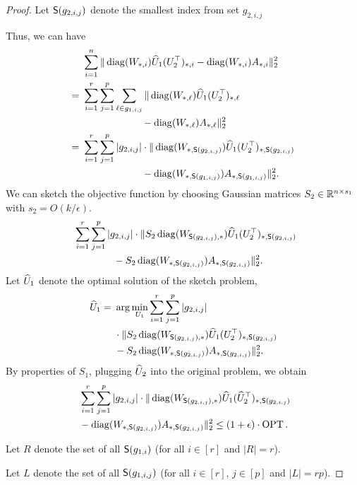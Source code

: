 \begin{proof}
Let $\S(g_{2,i,j})$ denote the smallest index from set $g_{2,i,j}$

Thus, we can have 
\begin{align*}
    & ~ \sum_{i=1}^n \| \diag( W_{*,i} ) \wh{U}_1   (U_2^\top )_{*,i}  -  \diag( W_{*,i} ) A_{*,i} \|_2^2 \\
    = & ~ \sum_{i=1}^r \sum_{j =1}^p \sum_{\ell \in g_{1,i,j}} \|  \diag( W_{*,\ell} ) \wh{U}_1 (U_2^\top )_{*,\ell} \\
    & ~ \quad\quad\quad\quad\quad\quad - \diag( W_{*,\ell} ) A_{*,\ell}  \|_2^2 \\
    = & ~\sum_{i=1}^r \sum_{j =1}^p |g_{2,i,j}| \cdot \|  \diag( W_{ *, \S(g_{2,i,j}) } ) \wh{U}_1 (U_2^\top )_{*, \S(g_{2,i,j})} \\
    & ~ \quad\quad\quad\quad\quad\quad -  \diag( W_{*, \S(g_{1,i,j})} ) A_{*,\S(g_{1,i,j})} \|_2^2 .
\end{align*}
We can sketch the objective function by choosing Gaussian matrices $S_2 \in \R^{n \times s_1}$ with $s_2 = O(k/\epsilon)$.
\begin{align*}
& ~ \sum_{i=1}^r \sum_{j =1}^p |g_{2,i,j}| \cdot \| S_2  \diag( W_{ \S(g_{2,i,j}),*} ) \wh{U}_1  (U_2^\top )_{*, \S(g_{2,i,j}) } \\
& ~ \quad\quad\quad\quad - S_2 \diag( W_{*, \S(g_{2,i,j})} )  A_{*, \S(g_{2,i,j}) }  \|_2^2.
\end{align*}
Let $\wh{U}_1$ denote the optimal solution of the sketch problem,
\begin{align*}
    \wh{U}_1 = & ~ \arg\min_{U_1} \sum_{i=1}^r \sum_{j =1}^p |g_{2,i,j}| \\
    & ~  \cdot \| S_2  \diag( W_{ \S(g_{2,i,j}),*} ) \wh{U}_1  (U_2^\top )_{*, \S(g_{2,i,j}) } \\
    & ~ - S_2 \diag( W_{*, \S(g_{2,i,j})} )  A_{*, \S(g_{2,i,j}) }  \|_2^2.
\end{align*}
By properties of $S_1$, plugging $\wh{U}_2$ into the original problem, we obtain
\begin{align*}
& ~ \sum_{i=1}^r \sum_{j =1}^p |g_{2,i,j}| \cdot \|  \diag( W_{ \S(g_{2,i,j}),*} ) \wh{U}_1  ( \wh{U}_2^\top )_{*, \S(g_{2,i,j}) } \\
& ~ -  \diag( W_{*, \S(g_{2,i,j})} )  A_{*, \S(g_{2,i,j}) }  \|_2^2\leq (1+\epsilon) \cdot \OPT.
\end{align*}

Let $R$ denote the set of all $\S(g_{1,i})$ (for all $i \in [r]$ and $|R| = r$).

Let $L$ denote the set of all $\S(g_{1,i,j})$ (for all $i \in [r]$, $j \in [p]$ and $|L| = rp$).


\end{proof}
